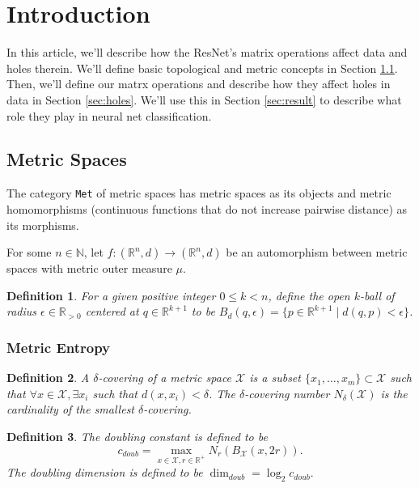 \documentclass{article}
\newtheorem{definition}{Definition}
\newcommand{\N}{\mathbb{N}}
\newcommand{\R}{\mathbb{R}}
\begin{document}
\section{Introduction}\label{sec:intro}
In this article, we'll describe how the ResNet's matrix operations affect data and holes therein.
We'll define basic topological and metric concepts in Section \ref{sec:metric}.
Then, we'll define our matrx operations and describe how they affect holes in data in Section \ref{sec:holes}.
We'll use this in Section \ref{sec:result} to describe what role they play in neural net classification.

\subsection{Metric Spaces}\label{sec:metric}
The category \texttt{Met} of metric spaces has metric spaces as its objects and metric homomorphisms (continuous functions that do not increase pairwise distance) as its morphisms.

For some $n\in\N$, let $f:(\R^n,d)\to(\R^n,d)$ be an automorphism between metric spaces with metric outer measure $\mu$.

\begin{definition}
For a given positive integer $0\le k<n$, define the \emph{open $k$-ball} of radius $\epsilon\in\R_{>0}$ centered at $q\in\R^{k+1}$ to be $B_d(q,\epsilon)=\{p\in\R^{k+1} \mid d(q,p)< \epsilon \}$.
\end{definition}

\subsubsection{Metric Entropy}
\begin{definition}
A \emph{$\delta$-covering} of a metric space $\mathcal{X}$ is a subset $\{x_1,\dots,x_m\}\subset \mathcal{X}$ such that $\forall x\in \mathcal{X}, \exists x_i$ such that $d(x,x_i)<\delta$. The \emph{$\delta$-covering number $N_\delta(\mathcal{X})$} is the cardinality of the smallest $\delta$-covering.
\end{definition}
\begin{definition}
The \emph{doubling constant} is defined to be $$c_{doub}=\max_{x\in\mathcal{X}, r\in\R^+} N_r(B_{\mathcal{X}}(x,2r)).$$
The \emph{doubling dimension} is defined to be $\dim_{doub}=\log_2 c_{doub}.$
\end{definition}
\end{document}
